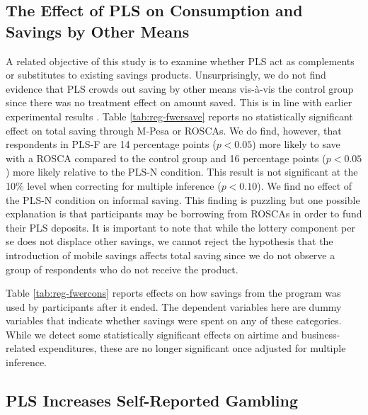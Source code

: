 \documentclass[11pt]{article}
\begin{document}
		\clearpage

	\subsection{The Effect of PLS on Consumption and Savings by Other Means}

		A related objective of this study is to examine whether PLS act as complements or substitutes to existing savings products. Unsurprisingly, we do not find evidence that PLS crowds out saving by other means vis-\`{a}-vis the control group since there was no treatment effect on amount saved. This is in line with earlier experimental results \parencite{atalay_savings_2014,filiz-ozbay_lottery_2015,dizon_leveraging_2016}. Table \ref{tab:reg-fwersave} reports no statistically significant effect on total saving through M-Pesa or ROSCAs. We do find, however, that respondents in PLS-F are 14 percentage points ($p < 0.05$) more likely to save with a ROSCA compared to the control group and 16 percentage points ($p < 0.05$) more likely relative to the PLS-N condition. This result is not significant at the 10\% level when correcting for multiple inference ($p < 0.10$). We find no effect of the PLS-N condition on informal saving. This finding is puzzling but one possible explanation is that participants may be borrowing from ROSCAs in order to fund their PLS deposits. It is important to note that while the lottery component per se does not displace other savings, we cannot reject the hypothesis that the introduction of mobile savings affects total saving since we do not observe a group of respondents who do not receive the product.

		

		Table \ref{tab:reg-fwercons} reports effects on how savings from the program was used by participants after it ended. The dependent variables here are dummy variables that indicate whether savings were spent on any of these categories. While we detect some statistically significant effects on airtime and business-related expenditures, these are no longer significant once adjusted for multiple inference.

		

	\subsection{PLS Increases Self-Reported Gambling}
\end{document}
